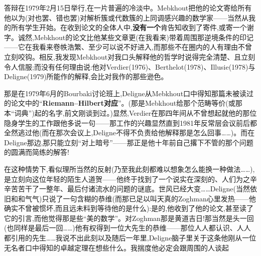 答辩在1979年2月15日举行,在一片普遍的冷淡中。Mebkhout把他的论文寄给所有他以为(对也罢、错也罢)对解析簇或代数簇的上同调感兴趣的数学家——当然从我的所有学生开始。在收到论文的全体人中,\textbf{没有一个}肯告知收到了寄件,或寄一个谢字。诚然,Mebkhout的论文比他某些文章更(在我看来)带着周围那逆境条件的印记——它在我看来卷帙浩繁、至少可以说不好进入,而那些不在圈内的人有理由不曾立刻咬钩。相\dmark{}反,我发现Mebkhout对我口头解释他的哲学时说得完全清楚、且立刻令人信服;而没有任何理由说:他对Verdier(1976)、Berthelot(1978)、Illusie(1978)与Deligne(1979)所能作的解释,会比对我作的那些逊色。

那是在1979年6月的Bourbaki讨论班上,Deligne从Mebkhout口中得知那篇未被读过的论文中的“\textbf{Riemann--Hilbert对应}”。(那是Mebkhout给那个范畴等价(或那本“词典”)起的名字,前文刚谈到过。)显然,Verdier在那四年间从不曾想起就他的那位隐身学生的工作跟他多说一句——那工作的兴趣显然直到1981年反常层会议前后都全然逃过他(而在那次会议上,Deligne不得不负责给他解释那是怎么回事……)。而在Deligne那边,那只能立刻“对上暗号”——那正是他十年前自己撂下不管的那个问题的圆满而简练的解答!

在这种情势下,看似理所当然的反射(乃至我此刻都难以想象怎么能换一种做法……),是立刻向这位年轻的陌生人道贺——他终于找到了一个说实在深刻的、人们为之辛辛苦苦干了一整年、最后付诸流水的问题的谜底。世风已经大变……Deligne(当然依旧和和气气)只说了一句含糊的恭维(而那已足以叫天真的Zoghman心里发热——他确实不曾被惯坏,而且远未料到等待他的是什么):是的,他收到了他的论文,甚至读了它的引言,而他觉得那是些“美的数学”。对Zoghman那是黄道吉日!那当然是头一回(也同样是最后一回……)他有权得到一位大先生的恭维——那位人人都认识、人人都引用的先生……我说不出此刻以及随后一年里,Deligne脑子里关于这条他刚从一位无名者口中得知的卓越定理在想些什么。我揣度他必定会跟周围\dmark{}的人谈起

